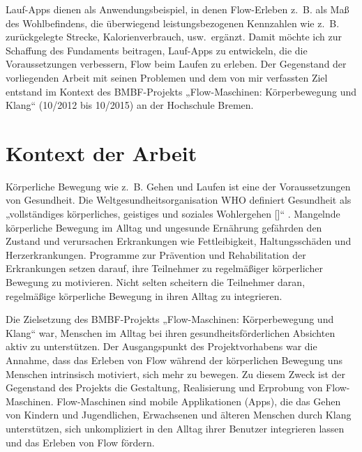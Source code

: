 Lauf-Apps dienen als Anwendungsbeispiel, in denen Flow-Erleben z.~B. als Maß des Wohlbefindens, die überwiegend leistungsbezogenen Kennzahlen wie z.~B. zurückgelegte Strecke, Kalorienverbrauch, usw.\ ergänzt. Damit möchte ich zur Schaffung des Fundaments beitragen, Lauf-Apps zu entwickeln, die die Voraussetzungen verbessern, Flow beim Laufen zu erleben. Der Gegenstand der vorliegenden Arbeit mit seinen Problemen und dem von mir verfassten Ziel entstand im Kontext des \acs{BMBF}-Projekts „Flow-Maschinen: Körperbewegung und Klang“ (10/2012 bis 10/2015) an der Hochschule Bremen.

\section{Kontext der Arbeit} 

\label{sec:kontext_der_arbeit}

Körperliche Bewegung wie z.~B. Gehen und Laufen ist eine der Voraussetzungen von Gesundheit. Die Weltgesundheitsorganisation \ac{WHO} definiert Gesundheit als „vollständiges körperliches, geistiges und soziales Wohlergehen [\textellipsis]“ \citep[S.~100]{WorldHealthOrganization1948}. Mangelnde körperliche Bewegung im Alltag und ungesunde Ernährung gefährden den Zustand und verursachen Erkrankungen wie Fettleibigkeit, Haltungsschäden und Herzerkrankungen. Programme zur Prävention und Rehabilitation der Erkrankungen setzen darauf, ihre Teilnehmer zu regelmäßiger körperlicher Bewegung zu motivieren. Nicht selten scheitern die Teilnehmer daran, regelmäßige körperliche Bewegung in ihren Alltag zu integrieren.

Die Zielsetzung des \acs{BMBF}-Projekts „Flow-Maschinen: Körperbewegung und Klang“ war, Menschen im Alltag bei ihren gesundheitsförderlichen Absichten aktiv zu unterstützen. Der Ausgangspunkt des Projektvorhabens war die Annahme, dass das Erleben von Flow während der körperlichen Bewegung uns Menschen intrinsisch motiviert, sich mehr zu bewegen. Zu diesem Zweck ist der Gegenstand des Projekts die Gestaltung, Realisierung und Erprobung von Flow-Maschinen. Flow-Maschinen sind mobile Applikationen (Apps), die das Gehen von Kindern und Jugendlichen, Erwachsenen und älteren Menschen durch Klang unterstützen, sich unkompliziert in den Alltag ihrer Benutzer integrieren lassen und das Erleben von Flow fördern.

